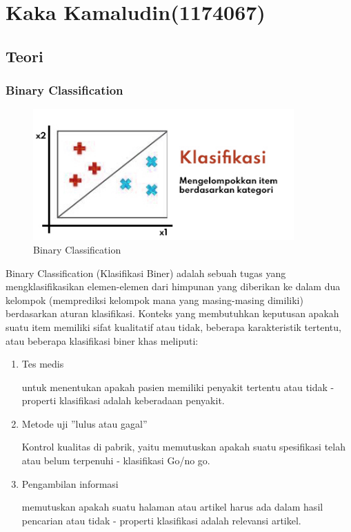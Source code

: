﻿\section{Kaka Kamaludin(1174067)}
\subsection{Teori}

\subsubsection{Binary Classification}
\begin{figure}[H]
\centerline{\includegraphics[width=10cm]{figures/1174067/2/1.jpg}}
\caption{Binary Classification}
\label{labelgambar}
\end{figure}
Binary Classification (Klasifikasi Biner) adalah sebuah tugas yang mengklasifikasikan elemen-elemen dari himpunan yang diberikan ke dalam dua kelompok (memprediksi kelompok mana yang masing-masing dimiliki) berdasarkan aturan klasifikasi. Konteks yang membutuhkan keputusan apakah suatu item memiliki sifat kualitatif atau tidak, beberapa karakteristik tertentu, atau beberapa klasifikasi
biner khas meliputi:
\begin{enumerate}
\item Tes medis 

untuk menentukan apakah pasien memiliki penyakit tertentu atau tidak - properti klasifikasi adalah keberadaan penyakit.

\item Metode uji ”lulus atau gagal”

Kontrol kualitas di pabrik, yaitu memutuskan apakah suatu spesifikasi telah atau belum terpenuhi - klasifikasi Go/no go.

\item Pengambilan informasi

memutuskan apakah suatu halaman atau artikel harus ada dalam hasil pencarian atau tidak - properti klasifikasi adalah relevansi artikel.
\end{enumerate}

